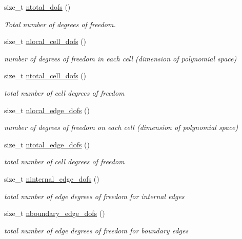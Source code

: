 \begin{DoxyCompactItemize}
size\+\_\+t \hyperlink{group__HybridCore2D_ga728e5b5aa3675a64e7dbc593ed9761f8}{ntotal\+\_\+dofs} ()
\begin{DoxyCompactList}\small\item\em Total number of degrees of freedom. \end{DoxyCompactList}\item 
size\+\_\+t \hyperlink{group__HybridCore2D_ga6faceb46cc896cd6d82a821828518730}{nlocal\+\_\+cell\+\_\+dofs} ()
\begin{DoxyCompactList}\small\item\em number of degrees of freedom in each cell (dimension of polynomial space) \end{DoxyCompactList}\item 
size\+\_\+t \hyperlink{group__HybridCore2D_gaf97e3efcc37ac51074c7136af3ca517b}{ntotal\+\_\+cell\+\_\+dofs} ()
\begin{DoxyCompactList}\small\item\em total number of cell degrees of freedom \end{DoxyCompactList}\item 
size\+\_\+t \hyperlink{group__HybridCore2D_ga6a45e5ff09d21b18874e1446cd9de9bc}{nlocal\+\_\+edge\+\_\+dofs} ()
\begin{DoxyCompactList}\small\item\em number of degrees of freedom on each cell (dimension of polynomial space) \end{DoxyCompactList}\item 
size\+\_\+t \hyperlink{group__HybridCore2D_ga49a703b6786215e5acf8bb59ecdbc9ea}{ntotal\+\_\+edge\+\_\+dofs} ()
\begin{DoxyCompactList}\small\item\em total number of cell degrees of freedom \end{DoxyCompactList}\item 
size\+\_\+t \hyperlink{group__HybridCore2D_gae6e771ab58f248db8f051d47de982cf5}{ninternal\+\_\+edge\+\_\+dofs} ()
\begin{DoxyCompactList}\small\item\em total number of edge degrees of freedom for internal edges \end{DoxyCompactList}\item 
size\+\_\+t \hyperlink{group__HybridCore2D_ga5fd63afc45211d3005f6e25682c533b2}{nboundary\+\_\+edge\+\_\+dofs} ()
\begin{DoxyCompactList}\small\item\em total number of edge degrees of freedom for boundary edges \end{DoxyCompactList}\item 

\end{DoxyCompactItemize}
